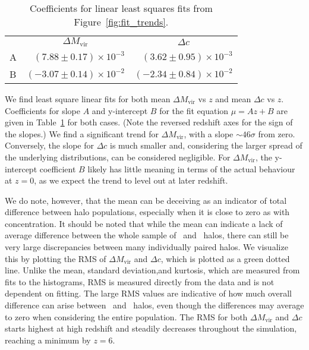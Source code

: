 \begin{table}[t]
	\centering
	\caption{Coefficients for linear least squares fits from Figure~\ref{fig:fit_trends}.}
	\begin{tabular}{ l  r  r }
		\toprule
		& \multicolumn{1}{c}{$\Delta M_{\mathrm{vir}}$} & \multicolumn{1}{c}{$\Delta c$} \\
		\cmidrule(l){2-3}
		A &  $(7.88 \pm 0.17) \times 10^{-3}$ &  $(3.62 \pm 0.95) \times 10^{-3}$ \\
		B & $(-3.07 \pm 0.14) \times 10^{-2}$ & $(-2.34 \pm 0.84) \times 10^{-2}$ \\
		\bottomrule
	\end{tabular}
	\label{tab:coeffs}
\end{table}

We find least square linear fits for both mean $\Delta M_{\mathrm{vir}}$ vs $z$ and mean $\Delta c$ vs $z$.  Coefficients for slope $A$ and y-intercept $B$ for the fit equation $\mu = A z + B$ are given in Table~\ref{tab:coeffs} for both cases.  (Note the reversed redshift axes for the sign of the slopes.)  We find a significant trend for $\Delta M_{\mathrm{vir}}$, with a slope $\sim 46 \sigma$ from zero.  Conversely, the slope for $\Delta c$ is much smaller and, considering the larger spread of the underlying distributions, can be considered negligible.  For $\Delta M_{\mathrm{vir}}$, the y-intercept coefficient $B$ likely has little meaning in terms of the actual behaviour at $z = 0$, as we expect the trend to level out at later redshift.

We do note, however, that the mean can be deceiving as an indicator of total difference between halo populations, especially when it is close to zero as with concentration.  It should be noted that while the mean can indicate a lack of average difference between the whole sample of \lpt\ and \za\ halos, there can still be very large discrepancies between many individually paired halos.  We visualize this by plotting the RMS of $\Delta M_{\mathrm{vir}}$ and $\Delta c$, which is plotted as a green dotted line.  Unlike the mean, standard deviation,and kurtosis, which are measured from fits to the histograms, RMS is measured directly from the data and is not dependent on fitting.  The large RMS values are indicative of how much overall difference can arise between \lpt\ and \za\ halos, even though the differences may average to zero when considering the entire population.  The RMS for both $\Delta M_{\mathrm{vir}}$ and $\Delta c$ starts highest at high redshift and steadily decreases throughout the simulation, reaching a minimum by $z = 6$.

